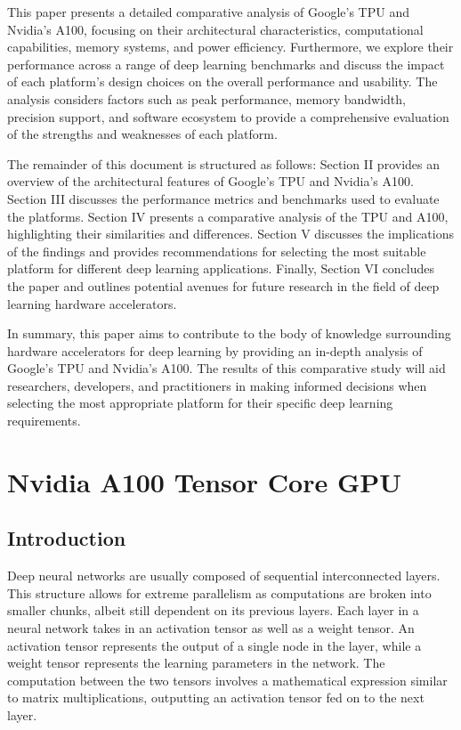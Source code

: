 \documentclass[conference]{IEEEtran}
\begin{document}
    This paper presents a detailed comparative analysis of Google's TPU and Nvidia's A100, focusing on their architectural characteristics, computational capabilities, memory systems, and power efficiency.
    Furthermore, we explore their performance across a range of deep learning benchmarks and discuss the impact of each platform's design choices on the overall performance and usability.
    The analysis considers factors such as peak performance, memory bandwidth, precision support, and software ecosystem to provide a comprehensive evaluation of the strengths and weaknesses of each platform.

    The remainder of this document is structured as follows: Section II provides an overview of the architectural features of Google's TPU and Nvidia's A100.
    Section III discusses the performance metrics and benchmarks used to evaluate the platforms.
    Section IV presents a comparative analysis of the TPU and A100, highlighting their similarities and differences.
    Section V discusses the implications of the findings and provides recommendations for selecting the most suitable platform for different deep learning applications.
    Finally, Section VI concludes the paper and outlines potential avenues for future research in the field of deep learning hardware accelerators.

    In summary, this paper aims to contribute to the body of knowledge surrounding hardware accelerators for deep learning by providing an in-depth analysis of Google's TPU and Nvidia's A100.
    The results of this comparative study will aid researchers, developers, and practitioners in making informed decisions when selecting the most appropriate platform for their specific deep learning requirements.


    \section{Nvidia A100 Tensor Core GPU}

    \subsection{Introduction}
    Deep neural networks are usually composed of sequential interconnected layers.
    This structure allows for extreme parallelism as computations are broken into smaller chunks, albeit still dependent on its previous layers.
    Each layer in a neural network takes in an activation tensor as well as a weight tensor.
    An activation tensor represents the output of a single node in the layer, while a weight tensor represents the learning parameters in the network.
    The computation between the two tensors involves a mathematical expression similar to matrix multiplications, outputting an activation tensor fed on to the next layer.
\end{document}
